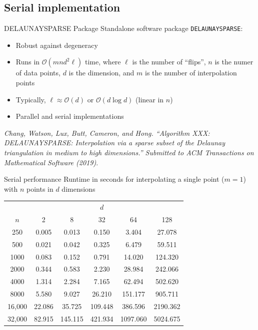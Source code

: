 \documentclass[xcolor=dvipsnames]{beamer}
\begin{document}
\subsection{Serial implementation}
\begin{frame}{DELAUNAYSPARSE Package}
Standalone software package {\tt DELAUNAYSPARSE}:
\begin{itemize}
\item Robust against degeneracy
\item Runs in $\mathcal{O}(m n d^2 \ell)$ time, where $\ell$ is the
number of ``flips'', $n$ is the numer of data points, $d$ is the dimension,
and $m$ is the number of interpolation points
\item Typically, $\ell \approx \mathcal{O}(d)$ or $\mathcal{O}(d\log d)$
(linear in $n$)
\item Parallel and serial implementations
\end{itemize}
\vfill
{\small \it Chang, Watson, Lux, Butt, Cameron, and Hong.
``Algorithm XXX: DELAUNAYSPARSE: Interpolation via a sparse subset of the
Delaunay triangulation in medium to high dimensions.''
Submitted to ACM Transactions on Mathematical Software (2019)}. 
\end{frame}
\begin{frame}{Serial performance}
Runtime in seconds for interpolating a single point ($m=1$) with $n$ points
in $d$ dimensions\\
\bigskip
\medskip
\begin{tabular}{c|ccccc}
& & & $d$ & & \\
$n$ & 2 & 8 & 32 & 64 & 128 \\
\hline
250    & 0.005  & 0.013   & 0.150   & 3.404    & 27.078   \\
500    & 0.021  & 0.042   & 0.325   & 6.479    & 59.511   \\
1000   & 0.083  & 0.152   & 0.791   & 14.020   & 124.320  \\
2000   & 0.344  & 0.583   & 2.230   & 28.984   & 242.066  \\
4000   & 1.314  & 2.284   & 7.165   & 62.494   & 502.620  \\
8000   & 5.580  & 9.027   & 26.210  & 151.177  & 905.711  \\
16,000 & 22.086 & 35.725  & 109.448 & 386.596  & 2190.362 \\
32,000 & 82.915 & 145.115 & 421.934 & 1097.060 & 5024.675 \\
\end{tabular}
\end{frame}
\end{document}
